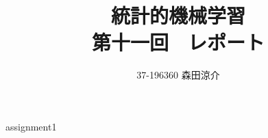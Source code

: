\documentclass[dvipdfmx, fleqn, titlepage]{jsarticle}
\title{
	統計的機械学習 \\
	第十一回　レポート
	}
\author{37-196360 \quad 森田涼介}
\begin{document}
\maketitle
{assignment1}
\end{document}
